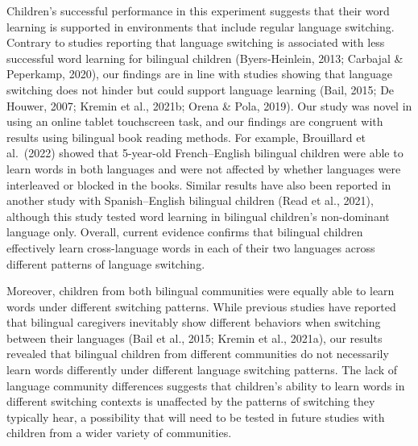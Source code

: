 \documentclass[
  man,floatsintext]{apa7}
\begin{document}
Children's successful performance in this experiment suggests that their word learning is supported in environments that include regular language switching. Contrary to studies reporting that language switching is associated with less successful word learning for bilingual children (Byers-Heinlein, 2013; Carbajal \& Peperkamp, 2020), our findings are in line with studies showing that language switching does not hinder but could support language learning (Bail, 2015; De Houwer, 2007; Kremin et al., 2021b; Orena \& Pola, 2019). Our study was novel in using an online tablet touchscreen task, and our findings are congruent with results using bilingual book reading methods. For example, Brouillard et al.~(2022) showed that 5-year-old French--English bilingual children were able to learn words in both languages and were not affected by whether languages were interleaved or blocked in the books. Similar results have also been reported in another study with Spanish--English bilingual children (Read et al., 2021), although this study tested word learning in bilingual children's non-dominant language only. Overall, current evidence confirms that bilingual children effectively learn cross-language words in each of their two languages across different patterns of language switching.

Moreover, children from both bilingual communities were equally able to learn words under different switching patterns. While previous studies have reported that bilingual caregivers inevitably show different behaviors when switching between their languages (Bail et al., 2015; Kremin et al., 2021a), our results revealed that bilingual children from different communities do not necessarily learn words differently under different language switching patterns. The lack of language community differences suggests that children's ability to learn words in different switching contexts is unaffected by the patterns of switching they typically hear, a possibility that will need to be tested in future studies with children from a wider variety of communities.
\end{document}
